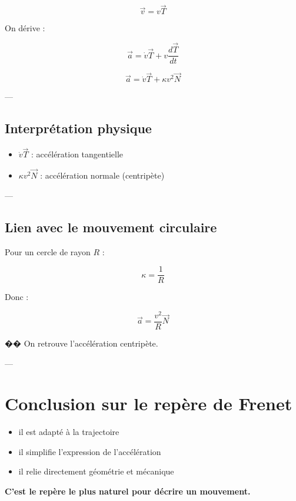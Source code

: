 \documentclass[11pt,a4paper]{article}
\begin{document}
\[
\vec{v} = v \vec{T}
\]

On dérive :

\[
\vec{a} = \dot{v}\vec{T} + v \frac{d\vec{T}}{dt}
\]

\[
\vec{a} = \dot{v}\vec{T} + \kappa v^2 \vec{N}
\]

---

\subsection{Interprétation physique}

\begin{itemize}
\item $\dot{v}\vec{T}$ : accélération tangentielle
\item $\kappa v^2 \vec{N}$ : accélération normale (centripète)
\end{itemize}

---

\subsection{Lien avec le mouvement circulaire}

Pour un cercle de rayon $R$ :

\[
\kappa = \frac{1}{R}
\]

Donc :

\[
\vec{a} = \frac{v^2}{R} \vec{N}
\]

�� On retrouve l’accélération centripète.

---

\section{Conclusion sur le repère de Frenet}

\begin{itemize}
\item il est adapté à la trajectoire
\item il simplifie l’expression de l’accélération
\item il relie directement géométrie et mécanique
\end{itemize}

\bigskip

\begin{center}
\textbf{C’est le repère le plus naturel pour décrire un mouvement.}
\end{center}
\end{document}
